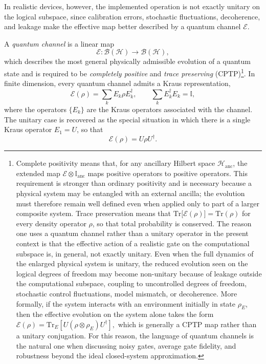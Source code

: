In realistic devices, however, the implemented operation is not exactly unitary on the logical subspace, since calibration errors, stochastic fluctuations, decoherence, and leakage make the effective map better described by a quantum channel $\mathcal{E}$. 


A \emph{quantum channel} is a linear map
\begin{equation}
\mathcal{E} : \mathcal{B}(\mathcal{H}) \to \mathcal{B}(\mathcal{H}),
\label{eq:quantum_channel_map}
\end{equation}
which describes the most general physically admissible evolution of a quantum state and is required to be \emph{completely positive} and \emph{trace preserving} (CPTP)\footnote{Complete positivity means that, for any ancillary Hilbert space \(\mathcal{H}_{\mathrm{anc}}\), the extended map
\(
\mathcal{E}\otimes \mathbb{I}_{\mathrm{anc}}
\)
maps positive operators to positive operators. This requirement is stronger than ordinary positivity and is necessary because a physical system may be entangled with an external ancilla; the evolution must therefore remain well defined even when applied only to part of a larger composite system. Trace preservation means that
\(
\mathrm{Tr}\!\bigl[\mathcal{E}(\rho)\bigr]=\mathrm{Tr}(\rho)
\)
for every density operator \(\rho\), so that total probability is conserved. The reason one uses a quantum channel rather than a unitary operator in the present context is that the effective action of a realistic gate on the computational subspace is, in general, not exactly unitary. Even when the full dynamics of the enlarged physical system is unitary, the reduced evolution seen on the logical degrees of freedom may become non-unitary because of leakage outside the computational subspace, coupling to uncontrolled degrees of freedom, stochastic control fluctuations, model mismatch, or decoherence. More formally, if the system interacts with an environment initially in state \(\rho_E\), then the effective evolution on the system alone takes the form
\(
\mathcal{E}(\rho)=\mathrm{Tr}_E\!\left[U(\rho\otimes\rho_E)U^\dagger\right],
\)
which is generally a CPTP map rather than a unitary conjugation. For this reason, the language of quantum channels is the natural one when discussing noisy gates, average gate fidelity, and robustness beyond the ideal closed-system approximation.}. In finite dimension, every quantum channel admits a Kraus representation,
\begin{equation}
\mathcal{E}(\rho)
=
\sum_{k} E_k \rho E_k^\dagger,
\qquad
\sum_k E_k^\dagger E_k = \mathbb{I},
\label{eq:kraus_representation}
\end{equation}
where the operators \(\{E_k\}\) are the Kraus operators associated with the channel. The unitary case is recovered as the special situation in which there is a single Kraus operator \(E_1=U\), so that
\begin{equation}
\mathcal{E}(\rho)=U\rho U^\dagger.
\label{eq:unitary_channel_special_case}
\end{equation}

